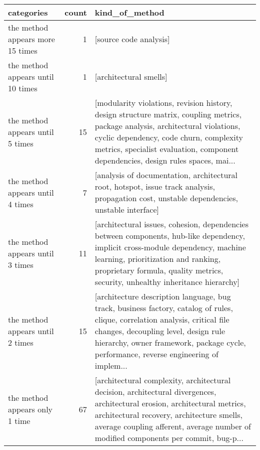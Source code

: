 \begin{tabular}{lrl}
\toprule
                        categories &  count &                                                                                                                                                                                                                                                  kind\_of\_method \\
\midrule
  the method appears more 15 times &      1 &                                                                                                                                                                                                                                          [source code analysis] \\
 the method appears until 10 times &      1 &                                                                                                                                                                                                                                          [architectural smells] \\
  the method appears until 5 times &     15 &  [modularity violations, revision history, design structure matrix, coupling metrics, package analysis, architectural violations, cyclic dependency, code churn, complexity metrics, specialist evaluation, component dependencies, design rules spaces, mai... \\
  the method appears until 4 times &      7 &                                                                                                                     [analysis of documentation, architectural root, hotspot, issue track analysis, propagation cost, unstable dependencies, unstable interface] \\
  the method appears until 3 times &     11 &         [architectural issues, cohesion, dependencies between components, hub-like dependency, implicit cross-module dependency, machine learning, prioritization and ranking, proprietary formula, quality metrics, security, unhealthy inheritance hierarchy] \\
  the method appears until 2 times &     15 &  [architecture description language, bug track, business factory, catalog of rules, clique, correlation analysis, critical file changes, decoupling level, design rule hierarchy, owner framework, package cycle, performance, reverse engineering of implem... \\
    the method appears only 1 time &     67 &  [architectural complexity, architectural decision, architectural divergences, architectural erosion, architectural metrics, architectural recovery, architecture smells, average coupling afferent, average number of modified components per commit, bug-p... \\
\bottomrule
\end{tabular}
